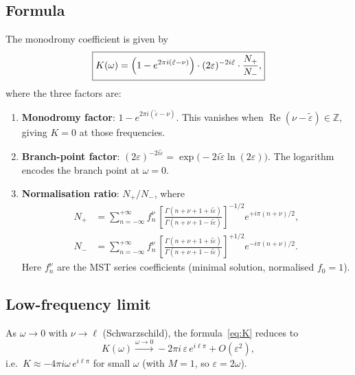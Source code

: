 \documentclass[12pt,a4paper]{article}
\newcommand{\epst}{\tilde{\varepsilon}}
\begin{document}
\subsection{Formula}

The monodromy coefficient is given by \cite{Leaver1986,MST1996}
\begin{equation}
  \boxed{K(\omega) = \Bigl(1 - e^{2\pi i(\epst - \nu)}\Bigr)
    \cdot (2\varepsilon)^{-2i\epst}
    \cdot \frac{N_+}{N_-},}
  \label{eq:K}
\end{equation}
where the three factors are:
\begin{enumerate}
  \item \textbf{Monodromy factor}: $1 - e^{2\pi i(\epst - \nu)}$.
    This vanishes when $\operatorname{Re}(\nu - \epst) \in \mathbb{Z}$,
    giving $K = 0$ at those frequencies.

  \item \textbf{Branch-point factor}: $(2\varepsilon)^{-2i\epst} =
    \exp\!\bigl(-2i\epst \ln(2\varepsilon)\bigr)$.
    The logarithm encodes the branch point at $\omega = 0$.

  \item \textbf{Normalisation ratio}: $N_+ / N_-$, where
    \begin{align}
      N_+ &= \sum_{n=-\infty}^{+\infty}
        f_n^{\nu}\,
        \left[\frac{\Gamma(n+\nu+1+i\epst)}{\Gamma(n+\nu+1-i\epst)}\right]^{-1/2}
        e^{+i\pi(n+\nu)/2},\label{eq:Nplus}\\
      N_- &= \sum_{n=-\infty}^{+\infty}
        f_n^{\nu}\,
        \left[\frac{\Gamma(n+\nu+1+i\epst)}{\Gamma(n+\nu+1-i\epst)}\right]^{+1/2}
        e^{-i\pi(n+\nu)/2}.\label{eq:Nminus}
    \end{align}
    Here $f_n^{\nu}$ are the MST series coefficients (minimal solution, normalised
    $f_0 = 1$).
\end{enumerate}

\subsection{Low-frequency limit}

As $\omega \to 0$ with $\nu \to \ell$ (Schwarzschild), the formula~\eqref{eq:K}
reduces to
\begin{equation}
  K(\omega) \xrightarrow{\omega \to 0}
  -2\pi i\,\varepsilon\,e^{i\ell\pi} + O(\varepsilon^2),
  \label{eq:Klowfreq}
\end{equation}
i.e.\ $K \approx -4\pi i\omega\,e^{i\ell\pi}$ for small $\omega$ (with $M=1$,
so $\varepsilon = 2\omega$).
\end{document}
